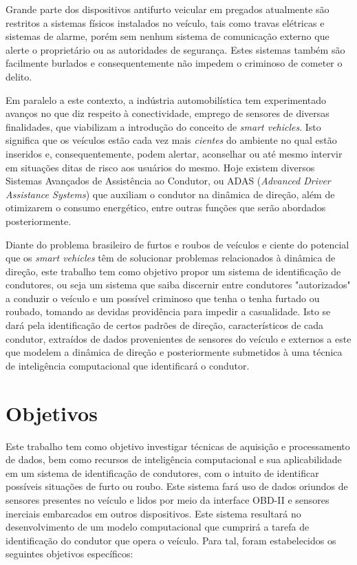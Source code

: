 Grande parte dos dispositivos antifurto veicular em pregados atualmente são restritos a sistemas físicos instalados no veículo, tais como travas elétricas e sistemas de alarme, porém sem nenhum sistema de comunicação externo que alerte o proprietário ou as autoridades de segurança. Estes sistemas também são facilmente burlados e consequentemente não impedem o criminoso de cometer o delito.

Em paralelo a este contexto, a indústria automobilística tem experimentado avanços no que diz respeito à conectividade, emprego de sensores de diversas finalidades, que viabilizam a introdução do conceito de \textit{smart vehicles}. Isto significa que os veículos estão cada vez mais \textit{cientes} do ambiente no qual estão inseridos e, consequentemente, podem alertar, aconselhar ou até mesmo intervir em situações ditas de risco aos usuários do mesmo. Hoje existem diversos Sistemas Avançados de Assistência ao Condutor, ou ADAS (\textit{Advanced Driver Assistance Systems}) que auxiliam o condutor na dinâmica de direção, além de otimizarem o consumo energético, entre outras funções que serão abordados posteriormente.

Diante do problema brasileiro de furtos e roubos de veículos e ciente do potencial que os \textit{smart vehicles} têm de solucionar problemas relacionados à dinâmica de direção, este trabalho tem como objetivo propor um sistema de identificação de condutores, ou seja um sistema que saiba discernir entre condutores "autorizados" a conduzir o veículo e um possível criminoso que tenha o tenha furtado ou roubado, tomando as devidas providência para impedir a casualidade. Isto se dará pela identificação de certos padrões de direção, característicos de cada condutor, extraídos de dados provenientes de sensores do veículo e externos a este que modelem a dinâmica de direção e posteriormente submetidos à uma técnica de inteligência computacional que identificará o condutor.

\section{Objetivos}

Este trabalho tem como objetivo investigar técnicas de aquisição e processamento de dados, bem como recursos de inteligência computacional e sua aplicabilidade em um sistema de identificação de condutores, com o intuito de identificar possíveis situações de furto ou roubo. Este sistema fará uso de dados oriundos de sensores presentes no veículo e lidos por meio da interface OBD-II e sensores inerciais embarcados em outros dispositivos. Este sistema resultará no desenvolvimento de um modelo computacional que cumprirá a tarefa de identificação do condutor que opera o veículo. Para tal, foram estabelecidos os seguintes objetivos específicos:

